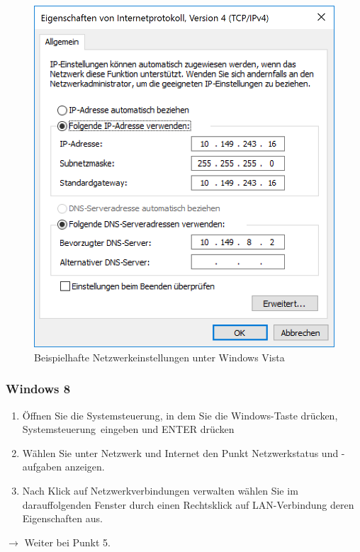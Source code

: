 \documentclass[a4paper,12pt]{scrartcl}
\begin{document}
\begin{figure}[h!]
\begin{minipage}[c]{0.48\linewidth}
          \includegraphics[width=\linewidth,keepaspectratio]{Bilder/IP_Windows}
          \caption{Beispielhafte Netzwerkeinstellungen unter Windows Vista}
        \end{minipage}
      \vspace{-20pt}
      \end{figure}
\subsubsection*{Windows 8}
\begin{enumerate}
	\item Öffnen Sie die Systemsteuerung, in dem Sie die Windows-Taste drücken, \glqq Systemsteuerung\grqq  \ eingeben und ENTER drücken
	\item Wählen Sie unter Netzwerk und Internet den Punkt Netzwerkstatus und -aufgaben anzeigen.
    \item Nach Klick auf Netzwerkverbindungen verwalten wählen Sie im darauffolgenden Fenster durch einen Rechtsklick auf LAN-Verbindung deren Eigenschaften aus.
\end{enumerate}
$\rightarrow$ Weiter bei Punkt 5.
\end{document}
